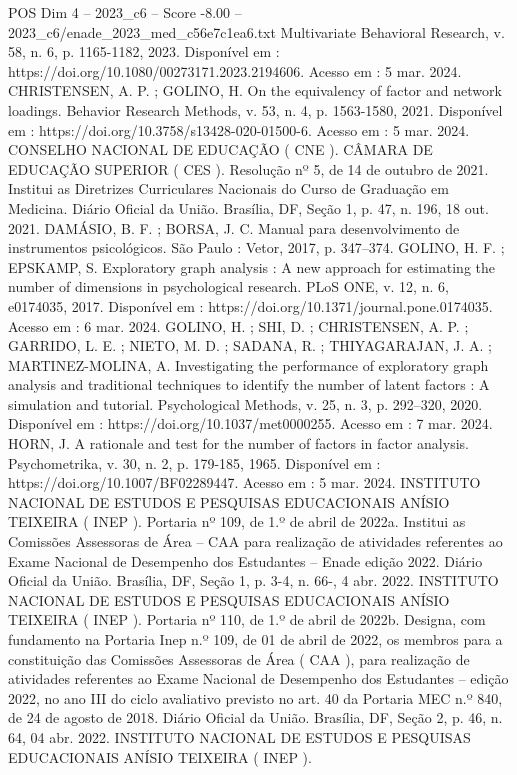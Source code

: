 \begin{textsample}{POS Dim 4 – 2023\_c6 – Score -8.00 – 2023\_c6/enade\_2023\_med\_c56e7c1ea6.txt}
Multivariate Behavioral Research, v. 58, n. 6, p. 1165-1182, 2023.
Disponível em : https://doi.org/10.1080/00273171.2023.2194606.
Acesso em : 5 mar. 2024.
CHRISTENSEN, A.
P. ; GOLINO, H.
On the equivalency of factor and network loadings.
Behavior Research Methods, v. 53, n. 4, p. 1563-1580, 2021.
Disponível em : https://doi.org/10.3758/s13428-020-01500-6.
Acesso em : 5 mar. 2024.
CONSELHO NACIONAL DE EDUCAÇÃO ( CNE ).
CÂMARA DE EDUCAÇÃO SUPERIOR ( CES ).
Resolução nº 5, de 14 de outubro de 2021.
Institui as Diretrizes Curriculares Nacionais do Curso de Graduação em Medicina.
Diário Oficial da União.
Brasília, DF, Seção 1, p. 47, n. 196, 18 out. 2021.
DAMÁSIO, B.
F. ; BORSA, J.
C.
Manual para desenvolvimento de instrumentos psicológicos.
São Paulo : Vetor, 2017, p. 347–374.
GOLINO, H.
F. ; EPSKAMP, S.
Exploratory graph analysis : A new approach for estimating the number of dimensions in psychological research.
PLoS ONE, v. 12, n. 6, e0174035, 2017.
Disponível em : https://doi.org/10.1371/journal.pone.0174035.
Acesso em : 6 mar. 2024.
GOLINO, H. ; SHI, D. ; CHRISTENSEN, A.
P. ; GARRIDO, L.
E. ; NIETO, M.
D. ; SADANA, R. ; THIYAGARAJAN, J.
A. ; MARTINEZ-MOLINA, A.
Investigating the performance of exploratory graph analysis and traditional techniques to identify the number of latent factors : A simulation and tutorial.
Psychological Methods, v. 25, n. 3, p. 292–320, 2020.
Disponível em : https://doi.org/10.1037/met0000255.
Acesso em : 7 mar. 2024.
HORN, J.
A rationale and test for the number of factors in factor analysis.
Psychometrika, v. 30, n. 2, p. 179-185, 1965.
Disponível em : https://doi.org/10.1007/BF02289447.
Acesso em : 5 mar. 2024.
INSTITUTO NACIONAL DE ESTUDOS E PESQUISAS EDUCACIONAIS ANÍSIO TEIXEIRA ( INEP ).
Portaria nº 109, de 1.º de abril de 2022a.
Institui as Comissões Assessoras de Área – CAA para realização de atividades referentes ao Exame Nacional de Desempenho dos Estudantes – Enade edição 2022.
Diário Oficial da União.
Brasília, DF, Seção 1, p. 3-4, n. 66-, 4 abr. 2022.
INSTITUTO NACIONAL DE ESTUDOS E PESQUISAS EDUCACIONAIS ANÍSIO TEIXEIRA ( INEP ).
Portaria nº 110, de 1.º de abril de 2022b.
Designa, com fundamento na Portaria Inep n.º 109, de 01 de abril de 2022, os membros para a constituição das Comissões Assessoras de Área ( CAA ), para realização de atividades referentes ao Exame Nacional de Desempenho dos Estudantes – edição 2022, no ano III do ciclo avaliativo previsto no art. 40 da Portaria MEC n.º 840, de 24 de agosto de 2018.
Diário Oficial da União.
Brasília, DF, Seção 2, p. 46, n. 64, 04 abr. 2022.
INSTITUTO NACIONAL DE ESTUDOS E PESQUISAS EDUCACIONAIS ANÍSIO TEIXEIRA ( INEP ).

\end{textsample}
